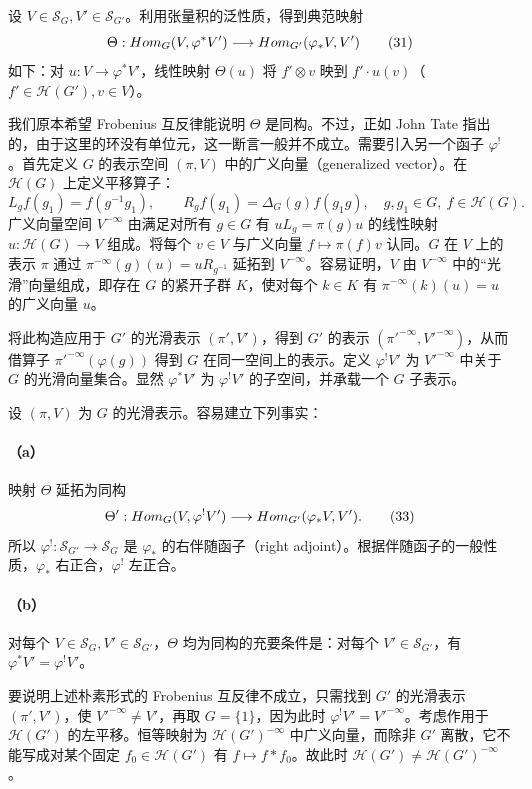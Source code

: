 设 $V\in\mathcal S_G,V'\in\mathcal S_{G'}$。利用张量积的泛性质，得到典范映射
\[
\Theta:Hom_G(V,\varphi^*V')\longrightarrow Hom_{G'}(\varphi_*V,V')\tag{31}
\]
如下：对 $u:V\to\varphi^*V'$，线性映射 $\Theta(u)$ 将 $f'\otimes v$ 映到 $f'\cdot u(v)$（$f'\in\mathcal H(G'),v\in V$）。

我们原本希望 Frobenius 互反律能说明 $\Theta$ 是同构。不过，正如 John Tate 指出的，由于这里的环没有单位元，这一断言一般并不成立。需要引入另一个函子 $\varphi^!$。首先定义 $G$ 的表示空间 $(\pi,V)$ 中的广义向量（generalized vector）。在 $\mathcal H(G)$ 上定义平移算子：
\[
L_gf(g_1)=f(g^{-1}g_1),\qquad R_gf(g_1)=\Delta_G(g)f(g_1g),\quad g,g_1\in G,\ f\in\mathcal H(G).\tag{32}
\]
广义向量空间 $V^{-\infty}$ 由满足对所有 $g\in G$ 有 $uL_g=\pi(g)u$ 的线性映射 $u:\mathcal H(G)\to V$ 组成。将每个 $v\in V$ 与广义向量 $f\mapsto\pi(f)v$ 认同。$G$ 在 $V$ 上的表示 $\pi$ 通过 $\pi^{-\infty}(g)(u)=uR_{g^{-1}}$ 延拓到 $V^{-\infty}$。容易证明，$V$ 由 $V^{-\infty}$ 中的“光滑”向量组成，即存在 $G$ 的紧开子群 $K$，使对每个 $k\in K$ 有 $\pi^{-\infty}(k)(u)=u$ 的广义向量 $u$。

将此构造应用于 $G'$ 的光滑表示 $(\pi',V')$，得到 $G'$ 的表示 $(\pi'^{-\infty},V'^{-\infty})$，从而借算子 $\pi'^{-\infty}(\varphi(g))$ 得到 $G$ 在同一空间上的表示。定义 $\varphi^!V'$ 为 $V'^{-\infty}$ 中关于 $G$ 的光滑向量集合。显然 $\varphi^*V'$ 为 $\varphi^!V'$ 的子空间，并承载一个 $G$ 子表示。

设 $(\pi,V)$ 为 $G$ 的光滑表示。容易建立下列事实：
\paragraph*{（a）}
映射 $\Theta$ 延拓为同构
\[
\Theta':Hom_G(V,\varphi^!V')\longrightarrow Hom_{G'}(\varphi_*V,V').\tag{33}
\]
所以 $\varphi^!:\mathcal S_{G'}\to\mathcal S_G$ 是 $\varphi_*$ 的右伴随函子（right adjoint）。根据伴随函子的一般性质，$\varphi_*$ 右正合，$\varphi^!$ 左正合。
\paragraph*{（b）}
对每个 $V\in\mathcal S_G,V'\in\mathcal S_{G'}$，$\Theta$ 均为同构的充要条件是：对每个 $V'\in\mathcal S_{G'}$，有 $\varphi^*V'=\varphi^!V'$。

要说明上述朴素形式的 Frobenius 互反律不成立，只需找到 $G'$ 的光滑表示 $(\pi',V')$，使 $V'^{-\infty}\ne V'$，再取 $G=\{1\}$，因为此时 $\varphi^!V'=V'^{-\infty}$。考虑作用于 $\mathcal H(G')$ 的左平移。恒等映射为 $\mathcal H(G')^{-\infty}$ 中广义向量，而除非 $G'$ 离散，它不能写成对某个固定 $f_0\in\mathcal H(G')$ 有 $f\mapsto f*f_0$。故此时 $\mathcal H(G')\ne\mathcal H(G')^{-\infty}$。
